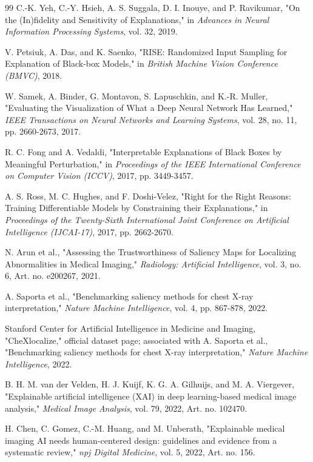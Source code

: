 \begin{thebibliography}{99}
 C.-K. Yeh, C.-Y. Hsieh, A. S. Suggala, D. I. Inouye, and P. Ravikumar, "On the (In)fidelity and Sensitivity of Explanations," in \emph{Advances in Neural Information Processing Systems}, vol. 32, 2019.

 V. Petsiuk, A. Das, and K. Saenko, "RISE: Randomized Input Sampling for Explanation of Black-box Models," in \emph{British Machine Vision Conference (BMVC)}, 2018.

 W. Samek, A. Binder, G. Montavon, S. Lapuschkin, and K.-R. Muller, "Evaluating the Visualization of What a Deep Neural Network Has Learned," \emph{IEEE Transactions on Neural Networks and Learning Systems}, vol. 28, no. 11, pp. 2660-2673, 2017.

 R. C. Fong and A. Vedaldi, "Interpretable Explanations of Black Boxes by Meaningful Perturbation," in \emph{Proceedings of the IEEE International Conference on Computer Vision (ICCV)}, 2017, pp. 3449-3457.

 A. S. Ross, M. C. Hughes, and F. Doshi-Velez, "Right for the Right Reasons: Training Differentiable Models by Constraining their Explanations," in \emph{Proceedings of the Twenty-Sixth International Joint Conference on Artificial Intelligence (IJCAI-17)}, 2017, pp. 2662-2670.

 N. Arun et al., "Assessing the Trustworthiness of Saliency Maps for Localizing Abnormalities in Medical Imaging," \emph{Radiology: Artificial Intelligence}, vol. 3, no. 6, Art. no. e200267, 2021.

 A. Saporta et al., "Benchmarking saliency methods for chest X-ray interpretation," \emph{Nature Machine Intelligence}, vol. 4, pp. 867-878, 2022.

 Stanford Center for Artificial Intelligence in Medicine and Imaging, "CheXlocalize," official dataset page; associated with A. Saporta et al., "Benchmarking saliency methods for chest X-ray interpretation," \emph{Nature Machine Intelligence}, 2022.

 B. H. M. van der Velden, H. J. Kuijf, K. G. A. Gilhuijs, and M. A. Viergever, "Explainable artificial intelligence (XAI) in deep learning-based medical image analysis," \emph{Medical Image Analysis}, vol. 79, 2022, Art. no. 102470.

 H. Chen, C. Gomez, C.-M. Huang, and M. Unberath, "Explainable medical imaging AI needs human-centered design: guidelines and evidence from a systematic review," \emph{npj Digital Medicine}, vol. 5, 2022, Art. no. 156.


\end{thebibliography}
